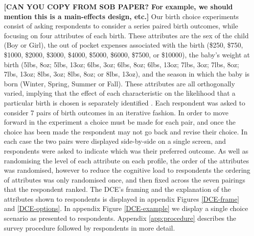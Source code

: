 \documentclass[a4paper, 11pt]{article}
\begin{document}
\begin{spacing}{1.4}
\textbf{[CAN YOU COPY FROM SOB PAPER? For example, we should mention this is a main-effects design, etc.]}
Our birth choice experiments consist of asking respondents to consider a series
paired birth outcomes, while focusing on four attributes of each birth.  These
attributes are the sex of the child (Boy or Girl), the out of pocket expenses
associated with the birth (\$250, \$750, \$1000, \$2000, \$3000, \$4000, \$5000,
\$6000, \$7500, or \$10000), the baby's weight at birth (5lbs, 8oz; 5lbs, 13oz;
6lbs, 3oz; 6lbs, 8oz; 6lbs, 13oz; 7lbs, 3oz; 7lbs, 8oz; 7lbs, 13oz; 8lbs, 3oz;
8lbs, 8oz; or 8lbs, 13oz), and the season in which the baby is born (Winter,
Spring, Summer or Fall).  These attributes are all orthogonally varied, implying
that the effect of each characteristic on the likelihood that a particular birth
is chosen is separately identified \citep{Marshalletal2010}. Each respondent
was asked to consider 7 pairs of birth outcomes in an iterative fashion.  In
order to move forward in the experiment a choice must be made for each pair,
and once the choice has been made the respondent may not go back and revise their
choice.  In each case the two pairs
were displayed side-by-side on a single screen, and respondents were asked to
indicate which was their preferred outcome.  As well as randomising the level
of each attribute on each profile, the order of the attributes was randomised,
however to reduce the cognitive load to respondents the ordering of attributes
was only randomised once, and then fixed across the seven pairings that the
respondent ranked.  The
DCE's framing and the explanation of the attributes shown to respondents is
displayed in appendix Figures \ref{DCE-frame} and \ref{DCE-options}.  In
appendix Figure \ref{DCE-example} we display a single choice scenario as
presented to respondents.  Appendix \ref{app:procedure} describes the
survey procedure followed by respondents in more detail.


\end{spacing}
\end{document}
